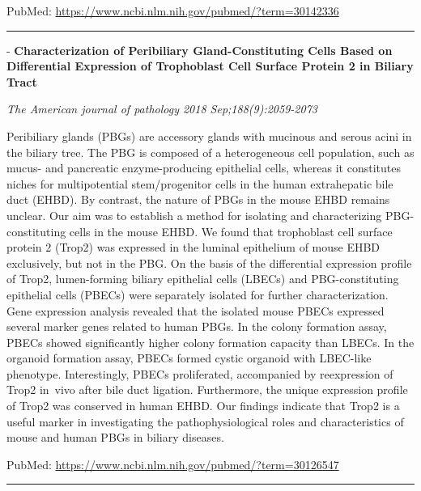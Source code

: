 \documentclass[]{article}
\begin{document}
PubMed: \url{https://www.ncbi.nlm.nih.gov/pubmed/?term=30142336}

{}

{}

\begin{center}\rule{0.5\linewidth}{\linethickness}\end{center}

 - \textbf{Characterization of Peribiliary Gland-Constituting Cells
Based on Differential Expression of Trophoblast Cell Surface Protein 2
in Biliary Tract}

\emph{The American journal of pathology 2018 Sep;188(9):2059-2073}

Peribiliary glands (PBGs) are accessory glands with mucinous and serous
acini in the biliary tree. The PBG is composed of a heterogeneous cell
population, such as mucus- and pancreatic enzyme-producing epithelial
cells, whereas it constitutes niches for multipotential stem/progenitor
cells in the human extrahepatic bile duct (EHBD). By contrast, the
nature of PBGs in the mouse EHBD remains unclear. Our aim was to
establish a method for isolating and characterizing PBG-constituting
cells in the mouse EHBD. We found that trophoblast cell surface protein
2 (Trop2) was expressed in the luminal epithelium of mouse EHBD
exclusively, but not in the PBG. On the basis of the differential
expression profile of Trop2, lumen-forming biliary epithelial cells
(LBECs) and PBG-constituting epithelial cells (PBECs) were separately
isolated for further characterization. Gene expression analysis revealed
that the isolated mouse PBECs expressed several marker genes related to
human PBGs. In the colony formation assay, PBECs showed significantly
higher colony formation capacity than LBECs. In the organoid formation
assay, PBECs formed cystic organoid with LBEC-like phenotype.
Interestingly, PBECs proliferated, accompanied by reexpression of Trop2
in~vivo after bile duct ligation. Furthermore, the unique expression
profile of Trop2 was conserved in human EHBD. Our findings indicate that
Trop2 is a useful marker in investigating the pathophysiological roles
and characteristics of mouse and human PBGs in biliary diseases.

PubMed: \url{https://www.ncbi.nlm.nih.gov/pubmed/?term=30126547}

{}

{}

\begin{center}\rule{0.5\linewidth}{\linethickness}\end{center}
\end{document}
